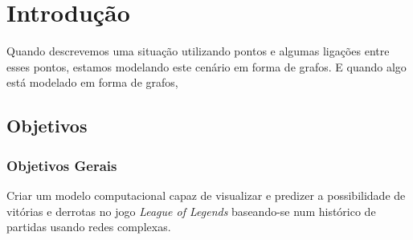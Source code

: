 \chapter{Introdução}
\label{chap:Introducao}

Quando descrevemos uma situação utilizando pontos e algumas ligações entre esses pontos, estamos modelando este cenário em forma de grafos. E quando algo está modelado em forma de grafos, 







\section{Objetivos}

\subsection{Objetivos Gerais}
Criar um modelo computacional capaz de visualizar e predizer a possibilidade de vitórias e derrotas no jogo \textit{League of Legends} baseando-se num histórico de partidas usando redes complexas.

